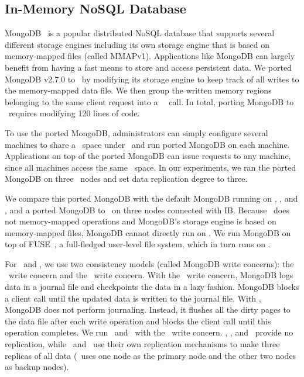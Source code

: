 \subsection{In-Memory NoSQL Database}
\label{sec:mongodb}
MongoDB~\cite{MongoDB} is a popular distributed NoSQL database that supports several different storage engines
including its own storage engine that is based on memory-mapped files (called MMAPv1).
Applications like MongoDB can largely benefit from having a fast means to store and access persistent data. 
We ported MongoDB v2.7.0 to \hotpot\ by modifying its storage engine to keep track of all writes to the memory-mapped data file.
We then group the written memory regions belonging to the same client request into a \hotpot\ \commit\ call.
In total, porting MongoDB to \hotpot\ requires modifying 120 lines of code. 

To use the ported MongoDB, administrators can simply configure several machines to share 
a \dsnvm\ space under \hotpot\ and run ported MongoDB on each machine.
Applications on top of the ported MongoDB can issue requests to any machine, 
since all machines access the same \dsnvm\ space.
In our experiments, we ran the ported MongoDB on three \hotpot\ nodes
and set data replication degree to three.

We compare this ported MongoDB with the default MongoDB running on \tmpfs, \pmfs, and \Octopus, 
and a ported MongoDB to \Mojim\ on three nodes connected with IB.
Because \Octopus\ does not memory-mapped operations and MongoDB's storage engine is based on memory-mapped files,
MongoDB cannot directly run on \Octopus.
We run MongoDB on top of FUSE~\cite{fuse-fs}, a full-fledged user-level file system, 
which in turn runs on \Octopus.

For \tmpfs\ and \pmfs, we use two consistency models (called MongoDB write concerns):
the \journaled\ write concern and the \fsyncsafe\ write concern. With the \journaled\ write concern, MongoDB
logs data in a journal file and checkpoints the data in a lazy fashion. MongoDB blocks a client call until the
updated data is written to the journal file. With \fsyncsafe, MongoDB does not perform journaling. Instead, it flushes
all the dirty pages to the data file after each write operation and blocks the client call until this operation completes.
We run \Octopus\ and \Mojim\ with the \fsyncsafe\ write concern.
\Octopus, \tmpfs, and \pmfs\ provide no replication,
while \Mojim\ and \hotpot\ use their own replication mechanisms to make three replicas of all data 
(\Mojim\ uses one node as the primary node and the other two nodes as backup nodes).

